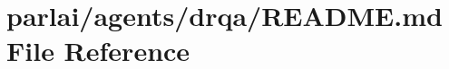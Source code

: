 \hypertarget{parlai_2agents_2drqa_2README_8md}{}\section{parlai/agents/drqa/\+R\+E\+A\+D\+ME.md File Reference}
\label{parlai_2agents_2drqa_2README_8md}
